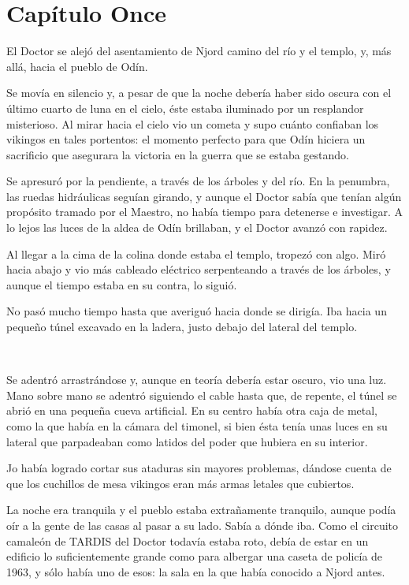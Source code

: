 \chapter*{Capítulo Once}

El Doctor se alejó del asentamiento de Njord camino del río y el templo,
y, más allá, hacia el pueblo de Odín.

Se movía en silencio y, a pesar de que la noche debería haber sido
oscura con el último cuarto de luna en el cielo, éste estaba iluminado
por un resplandor misterioso. Al mirar hacia el cielo vio un cometa y
supo cuánto confiaban los vikingos en tales portentos: el momento
perfecto para que Odín hiciera un sacrificio que asegurara la victoria
en la guerra que se estaba gestando.

Se apresuró por la pendiente, a través de los árboles y del río. En la
penumbra, las ruedas hidráulicas seguían girando, y aunque el Doctor
sabía que tenían algún propósito tramado por el Maestro, no había tiempo
para detenerse e investigar. A lo lejos las luces de la aldea de Odín
brillaban, y el Doctor avanzó con rapidez.

Al llegar a la cima de la colina donde estaba el templo, tropezó con
algo. Miró hacia abajo y vio más cableado eléctrico serpenteando a
través de los árboles, y aunque el tiempo estaba en su contra, lo
siguió.

No pasó mucho tiempo hasta que averiguó hacia donde se dirigía. Iba
hacia un pequeño túnel excavado en la ladera, justo debajo del lateral
del templo.

~

Se adentró arrastrándose y, aunque en teoría debería estar oscuro, vio
una luz. Mano sobre mano se adentró siguiendo el cable hasta que, de
repente, el túnel se abrió en una pequeña cueva artificial. En su centro
había otra caja de metal, como la que había en la cámara del timonel, si
bien ésta tenía unas luces en su lateral que parpadeaban como latidos
del poder que hubiera en su interior.

Jo había logrado cortar sus ataduras sin mayores problemas, dándose
cuenta de que los cuchillos de mesa vikingos eran más armas letales que
cubiertos.

La noche era tranquila y el pueblo estaba extrañamente tranquilo, aunque
podía oír a la gente de las casas al pasar a su lado. Sabía a dónde iba.
Como el circuito camaleón de TARDIS del Doctor todavía estaba roto,
debía de estar en un edificio lo suficientemente grande como para
albergar una caseta de policía de 1963, y sólo había uno de esos: la
sala en la que había conocido a Njord antes.

